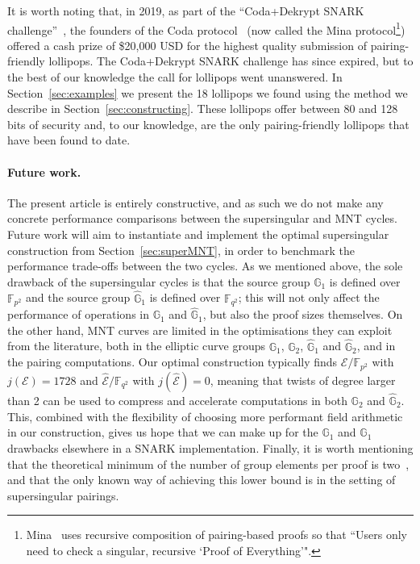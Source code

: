 \documentclass[version=preprint]{iacrcc}
\newcommand{\G}{\mathbb{G}}
\newcommand{\F}{\mathbb{F}}
\newcommand{\EC}{\mathcal{E}}
\begin{document}
\begin{enumerate}
It is worth noting that, in 2019, as part of the ``Coda+Dekrypt SNARK challenge''~\cite{coinlist}, the founders of the Coda protocol~\cite{coda} (now called the Mina protocol\footnote{Mina~\cite{mina} uses recursive composition of pairing-based proofs so that ``Users only need to check a singular, recursive `Proof of Everything'".}) offered a cash prize of \$20,000 USD for the highest quality submission of pairing-friendly lollipops. The Coda+Dekrypt SNARK challenge has since expired, but to the best of our knowledge the call for lollipops went unanswered. In Section~\ref{sec:examples} we present the 18 lollipops we found using the method we describe in Section~\ref{sec:constructing}. These lollipops offer between 80 and 128 bits of security and, to our knowledge, are the only pairing-friendly lollipops that have been found to date. 
\end{enumerate} 

\paragraph{Future work.} The present article is entirely constructive, and as such we do not make any concrete performance comparisons between the supersingular and MNT cycles. Future work will aim to instantiate and implement the optimal supersingular construction from Section~\ref{sec:superMNT}, in order to benchmark the performance trade-offs between the two cycles. As we mentioned above, the sole drawback of the supersingular cycles is that the source group $\G_1$ is defined over $\F_{p^2}$ and the source group $\hat{\G}_1$ is defined over $\F_{q^2}$; this will not only affect the performance of operations in $\G_1$ and $\hat{\G}_1$, but also the proof sizes themselves. On the other hand, MNT curves are limited in the optimisations they can exploit from the literature, both in the elliptic curve groups $\G_1$, $\G_2$, $\hat{\G}_1$ and $\hat{\G}_2$, and in the pairing computations. Our optimal construction typically finds $\EC/\F_{p^2}$ with $j(\EC)=1728$ and $\hat{\EC}/\F_{q^2}$ with $j(\hat{\EC})=0$, meaning that twists of degree larger than 2 can be used to compress and accelerate computations in both $\G_2$ and $\hat{\G}_2$. This, combined with the flexibility of choosing more performant field arithmetic in our construction, gives us hope that we can make up for the $\G_1$ and $\hat{\G}_1$ drawbacks elsewhere in a SNARK implementation. Finally, it is worth mentioning that the theoretical minimum of the number of group elements per proof is two~\cite{Groth16}, and that the only known way of achieving this lower bound is in the setting of supersingular pairings. 
\end{document}
